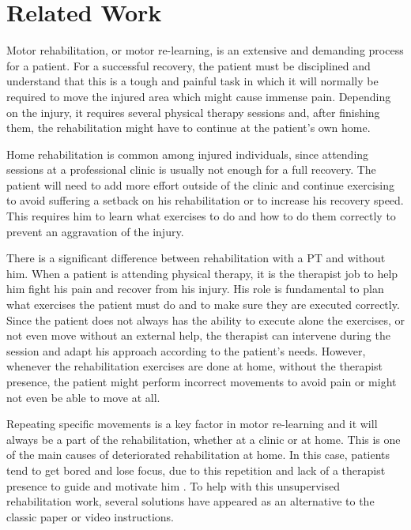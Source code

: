 \chapter{Related Work}
\label{section-related}


Motor rehabilitation, or motor re-learning, is an extensive and demanding process for a patient.
For a successful recovery, the patient must be disciplined and understand that this is a tough and painful task in which it
will normally be required to move the injured area which might cause immense pain\cite{Singh2014a}.
Depending on the injury, it requires several physical therapy sessions and, after finishing them, 
the rehabilitation might have to continue at the patient's own home\cite{Lohse2013}.

Home rehabilitation is common among injured individuals, since
attending sessions at a professional clinic is usually not enough for a full recovery.
The patient will need to add more effort outside of the clinic and continue 
exercising to avoid suffering a setback on his rehabilitation \cite{Borghese2013} 
or to increase his recovery speed. 
This requires him to learn what exercises to do and how to do 
them correctly to prevent an aggravation of the injury\cite{Tang2014a}.

There is a significant difference between rehabilitation with a \ac{PT} and without him.
When a patient is attending physical therapy, it is the therapist 
job to help him fight his pain and recover from his injury.
His role is fundamental to plan what exercises the patient must do and to make sure they are executed correctly. 
Since the patient does not always has the ability to execute alone the exercises, or not even move without an external help,
the therapist can intervene during the session and adapt his approach according to the patient's needs\cite{Sigrist2013}.
However, whenever the rehabilitation exercises are done at home, without the therapist presence, the patient might 
perform incorrect movements to avoid pain\cite{Tang2014a} or might not even be able to move at all.


Repeating specific movements is a key factor in motor re-learning \cite{Schonauer2011a} and it 
will always be a part of the rehabilitation, whether at a clinic or at home.
This is one of the main causes of deteriorated rehabilitation at home. In this case, patients tend to get bored and lose focus, 
due to this repetition and lack of a therapist presence to guide and motivate him \cite{Singh2014a, Balaam2011a, Rego2010}. 
To help with this unsupervised rehabilitation work, several solutions have appeared as 
an alternative to the classic paper or video instructions. 

